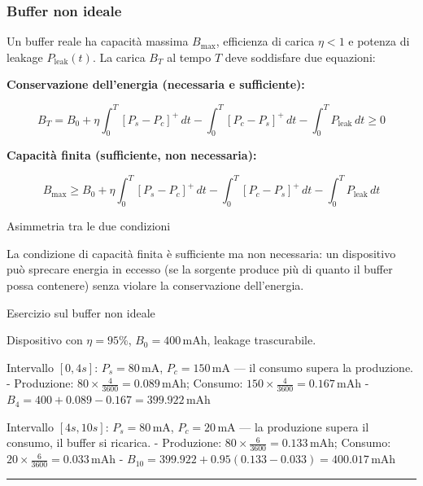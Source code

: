 \documentclass[
  italian,
  openany]{book}
\begin{document}
\subsubsection{Buffer non ideale}\label{buffer-non-ideale}

Un buffer reale ha capacità massima \(B_{\mathrm{max}}\), efficienza di
carica \(\eta < 1\) e potenza di leakage \(P_{\mathrm{leak}}(t)\). La
carica \(B_T\) al tempo \(T\) deve soddisfare due equazioni:

\textbf{Conservazione dell'energia (necessaria e sufficiente):}

\[B_T = B_0 + \eta\int_0^T [P_s - P_c]^+\,dt - \int_0^T [P_c - P_s]^+\,dt - \int_0^T P_{\mathrm{leak}}\,dt \geq 0\]

\textbf{Capacità finita (sufficiente, non necessaria):}

\[B_{\mathrm{max}} \geq B_0 + \eta\int_0^T [P_s - P_c]^+\,dt - \int_0^T [P_c - P_s]^+\,dt - \int_0^T P_{\mathrm{leak}}\,dt\]

\begin{calloutnote}{Asimmetria tra le due condizioni}

La condizione di capacità finita è sufficiente ma non necessaria: un
dispositivo può sprecare energia in eccesso (se la sorgente produce più
di quanto il buffer possa contenere) senza violare la conservazione
dell'energia.

\end{calloutnote}

\begin{callouttip}{Esercizio sul buffer non ideale}

Dispositivo con \(\eta = 95\%\), \(B_0 = 400\,\mathrm{mAh}\), leakage
trascurabile.

Intervallo \([0, 4s]\): \(P_s = 80\,\mathrm{mA}\),
\(P_c = 150\,\mathrm{mA}\) --- il consumo supera la produzione. -
Produzione: \(80 \times \frac{4}{3600} = 0.089\,\mathrm{mAh}\); Consumo:
\(150 \times \frac{4}{3600} = 0.167\,\mathrm{mAh}\) -
\(B_4 = 400 + 0.089 - 0.167 = 399.922\,\mathrm{mAh}\)

Intervallo \([4s, 10s]\): \(P_s = 80\,\mathrm{mA}\),
\(P_c = 20\,\mathrm{mA}\) --- la produzione supera il consumo, il buffer
si ricarica. - Produzione:
\(80 \times \frac{6}{3600} = 0.133\,\mathrm{mAh}\); Consumo:
\(20 \times \frac{6}{3600} = 0.033\,\mathrm{mAh}\) -
\(B_{10} = 399.922 + 0.95(0.133 - 0.033) = 400.017\,\mathrm{mAh}\)

\end{callouttip}

\begin{center}\rule{0.5\linewidth}{0.5pt}\end{center}
\end{document}
